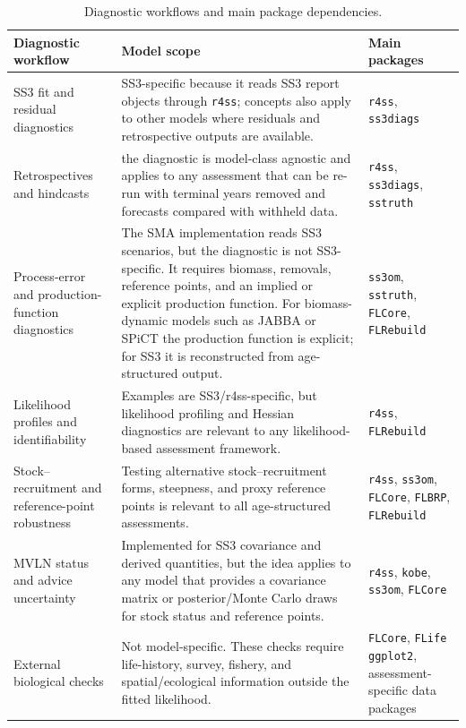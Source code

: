 \documentclass[11pt,a4paper]{article}
\begin{document}
\begin{table}[H]
  \centering
  \caption{Diagnostic workflows and main package dependencies.}
  \label{tab:diag-availability}
  \scriptsize
  \begin{tabularx}{\textwidth}{>{\raggedright\arraybackslash}p{3.0cm}>{\raggedright\arraybackslash}X>{\raggedright\arraybackslash}p{4.2cm}}
    \toprule
    Diagnostic workflow & Model scope & Main packages \\
    \midrule
    SS3 fit and residual diagnostics & SS3-specific because it reads SS3 report objects through \texttt{r4ss}; concepts also apply to other models where residuals and retrospective outputs are available. & \texttt{r4ss}, \texttt{ss3diags} \\
    Retrospectives and hindcasts & the diagnostic is model-class agnostic and applies to any assessment that can be re-run with terminal years removed and forecasts compared with withheld data. & \texttt{r4ss}, \texttt{ss3diags}, \texttt{sstruth} \\
    Process-error and production-function diagnostics & The SMA implementation reads SS3 scenarios, but the diagnostic is not SS3-specific. It requires biomass, removals, reference points, and an implied or explicit production function. For biomass-dynamic models such as JABBA or SPiCT the production function is explicit; for SS3 it is reconstructed from age-structured output. & \texttt{ss3om}, \texttt{sstruth}, \texttt{FLCore}, \texttt{FLRebuild} \\
    Likelihood profiles and identifiability & Examples are SS3/r4ss-specific, but likelihood profiling and Hessian diagnostics are relevant to any likelihood-based assessment framework. & \texttt{r4ss},  \texttt{FLRebuild} \\
    Stock--recruitment and reference-point robustness & Testing alternative stock--recruitment forms, steepness, and proxy reference points is relevant to all age-structured assessments. & \texttt{r4ss}, \texttt{ss3om}, \texttt{FLCore}, \texttt{FLBRP}, \texttt{FLRebuild} \\
    MVLN status and advice uncertainty & Implemented for SS3 covariance and derived quantities, but the idea applies to any model that provides a covariance matrix or posterior/Monte Carlo draws for stock status and reference points. & \texttt{r4ss}, \texttt{kobe}, \texttt{ss3om}, \texttt{FLCore} \\
    External biological checks & Not model-specific. These checks require life-history, survey, fishery, and spatial/ecological information outside the fitted likelihood. & \texttt{FLCore}, \texttt{FLife} \texttt{ggplot2}, assessment-specific data packages \\
    \bottomrule
  \end{tabularx}
\end{table}
\end{document}
